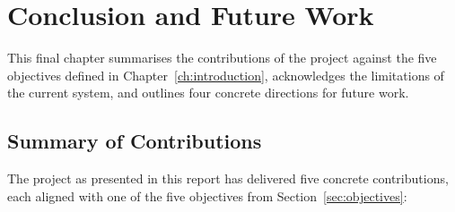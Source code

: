 \chapter{Conclusion and Future Work}
\label{ch:conclusion}

This final chapter summarises the contributions of the project
against the five objectives defined in Chapter~\ref{ch:introduction},
acknowledges the limitations of the current system, and outlines
four concrete directions for future work.

\section{Summary of Contributions}
\label{sec:conclusion-contrib}

The project as presented in this report has delivered five concrete
contributions, each aligned with one of the five objectives from
Section~\ref{sec:objectives}:

